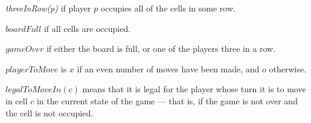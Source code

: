 \documentclass{../src/led_doc}
\begin{document}
\begin{ledCmnt}
{\em threeInRow(p)} if player $p$ occupies all of the cells in some row.
\end{ledCmnt}

\begin{ledDef}
\end{ledDef}

\begin{ledCmnt}
$boardFull$ if all cells are occupied.
\end{ledCmnt}

\begin{ledDef}
\end{ledDef}

\begin{ledCmnt}
$gameOver$ if either the board is full, or one of the players three in a row.
\end{ledCmnt}

\begin{ledDef}
\end{ledDef}

\begin{ledCmnt}
$playerToMove$ is $x$ if an even number of moves have been made, and $o$ otherwise.
\end{ledCmnt}

\begin{ledDef}
\end{ledDef}

\begin{ledDef}
\end{ledDef}

\begin{ledCmnt}
$legalToMoveIn(c)$ means that it is legal for the player whose
turn it is to move in cell $c$ in the current state of the game ---
that is, if the game is not over and the cell is not occupied.
\end{ledCmnt}

\begin{ledDef}
\end{ledDef}
\end{document}
